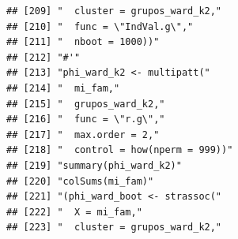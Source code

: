 \documentclass[11pt,]{article}
\begin{document}
\begin{verbatim}
## [209] "  cluster = grupos_ward_k2,"                                                                                                                                           
## [210] "  func = \"IndVal.g\","                                                                                                                                                
## [211] "  nboot = 1000))"                                                                                                                                                      
## [212] "#'"                                                                                                                                                                    
## [213] "phi_ward_k2 <- multipatt("                                                                                                                                             
## [214] "  mi_fam,"                                                                                                                                                             
## [215] "  grupos_ward_k2,"                                                                                                                                                     
## [216] "  func = \"r.g\","                                                                                                                                                     
## [217] "  max.order = 2,"                                                                                                                                                      
## [218] "  control = how(nperm = 999))"                                                                                                                                         
## [219] "summary(phi_ward_k2)"                                                                                                                                                  
## [220] "colSums(mi_fam)"                                                                                                                                                       
## [221] "(phi_ward_boot <- strassoc("                                                                                                                                           
## [222] "  X = mi_fam,"                                                                                                                                                         
## [223] "  cluster = grupos_ward_k2,"                                                                                                                                           

\end{verbatim}
\end{document}

